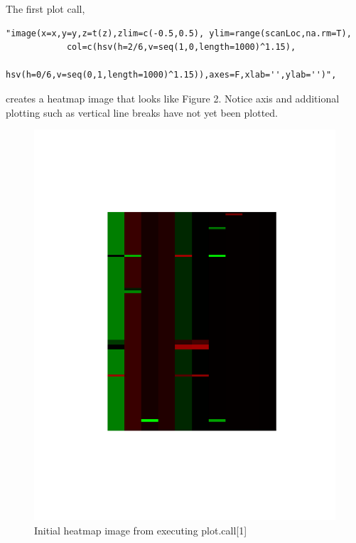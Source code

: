 \documentclass[]{article}
\begin{document}
The first plot call, 
\begin{verbatim}
"image(x=x,y=y,z=t(z),zlim=c(-0.5,0.5), ylim=range(scanLoc,na.rm=T),
            col=c(hsv(h=2/6,v=seq(1,0,length=1000)^1.15),
            hsv(h=0/6,v=seq(0,1,length=1000)^1.15)),axes=F,xlab='',ylab='')",
\end{verbatim}
creates a heatmap image that looks like Figure 2. Notice axis and additional plotting such as vertical line breaks have not yet been plotted.  
\begin{center}
\begin{figure}
\includegraphics[scale=.5]{heatmap}
\caption{Initial heatmap image from executing plot.call[1]}
\end{figure}
\end{center}
\end{document}
